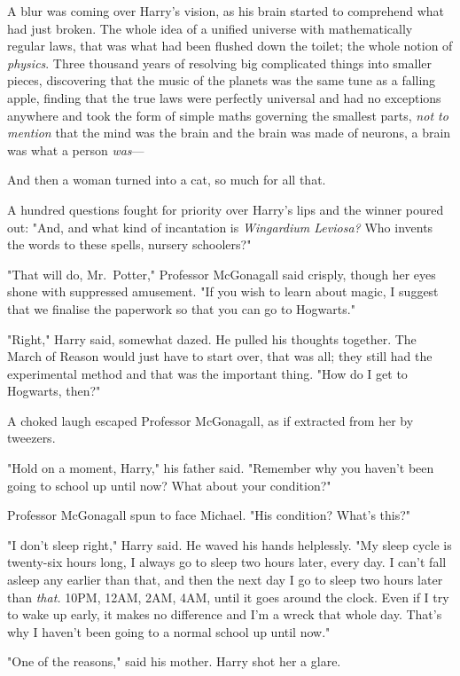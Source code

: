A blur was coming over Harry's vision, as his brain started to comprehend what 
had just broken. The whole idea of a unified universe with mathematically 
regular laws, that was what had been flushed down the toilet; the whole notion 
of \emph{physics}. Three thousand years of resolving big complicated things 
into smaller pieces, discovering that the music of the planets was the same 
tune as a falling apple, finding that the true laws were perfectly universal 
and had no exceptions anywhere and took the form of simple maths governing the 
smallest parts, \emph{not to mention} that the mind was the brain and the brain 
was made of neurons, a brain was what a person \emph{was}---

And then a woman turned into a cat, so much for all that.

A hundred questions fought for priority over Harry's lips and the winner poured 
out: "And, and what kind of incantation is \emph{Wingardium Leviosa?} Who 
invents the words to these spells, nursery schoolers?"

"That will do, Mr.~Potter," Professor McGonagall said crisply, though her eyes 
shone with suppressed amusement. "If you wish to learn about magic, I suggest 
that we finalise the paperwork so that you can go to Hogwarts."

"Right," Harry said, somewhat dazed. He pulled his thoughts together. The March 
of Reason would just have to start over, that was all; they still had the 
experimental method and that was the important thing. "How do I get to 
Hogwarts, then?"

A choked laugh escaped Professor McGonagall, as if extracted from her by 
tweezers.

"Hold on a moment, Harry," his father said. "Remember why you haven't been 
going to school up until now? What about your condition?"

Professor McGonagall spun to face Michael. "His condition? What's this?"

"I don't sleep right," Harry said. He waved his hands helplessly. "My sleep 
cycle is twenty-six hours long, I always go to sleep two hours later, every 
day. I can't fall asleep any earlier than that, and then the next day I go to 
sleep two hours later than \emph{that.} 10PM, 12AM, 2AM, 4AM, until it goes 
around the clock. Even if I try to wake up early, it makes no difference and 
I'm a wreck that whole day. That's why I haven't been going to a normal school 
up until now."

"One of the reasons," said his mother. Harry shot her a glare.

